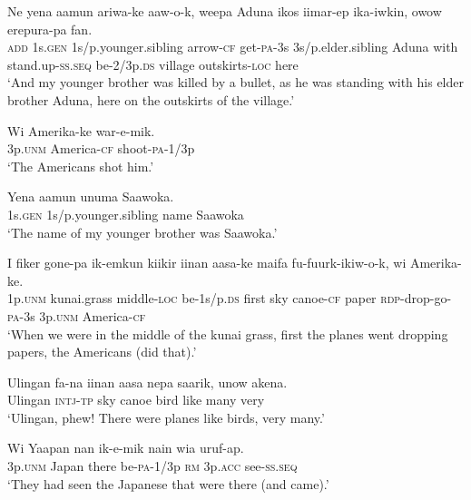 \ea\label{ex:a:x71}
\gll  Ne  yena  aamun  ariwa-ke  aaw-o-k, weepa  Aduna  ikos  iimar-ep  ika-iwkin,  owow  erepura-pa  fan. \\
\textsc{add}  1s.\textsc{gen}  1s/p.younger.sibling  arrow-\textsc{cf}  get-\textsc{pa}-3s 3s/p.elder.sibling  Aduna  with  stand.up-\textsc{ss.seq}  be-2/3p.\textsc{ds} village  outskirts-\textsc{loc}  here \\
\glt ‘And my younger brother was killed by a bullet, as he was standing with his elder brother Aduna, here on the outskirts of the village.’ \\
\z


\ea\label{ex:a:x72}
\gll  Wi  Amerika-ke  war-e-mik. \\
3p.\textsc{unm}  America-\textsc{cf}  shoot-\textsc{pa}-1/3p \\
\glt ‘The Americans shot him.’ \\
\z


\ea\label{ex:a:x73}
\gll  Yena  aamun  unuma  Saawoka. \\
1s.\textsc{gen}  1s/p.younger.sibling  name  Saawoka \\
\glt ‘The name of my younger brother was Saawoka.’ \\
\z


\ea\label{ex:a:x74}
\gll  I  fiker  gone-pa  ik-emkun  kiikir  iinan  aasa-ke maifa  fu-fuurk-ikiw-o-k,  wi  Amerika-ke. \\
1p.\textsc{unm}  kunai.grass  middle-\textsc{loc}  be-1s/p.\textsc{ds}  first  sky  canoe-\textsc{cf} paper  \textsc{rdp}-drop-go-\textsc{pa}-3s  3p.\textsc{unm}  America-\textsc{cf} \\
\glt ‘When we were in the middle of the kunai grass, first the planes went dropping papers, the Americans (did that).’ \\
\z


\ea\label{ex:a:x75}
\gll  Ulingan  fa-na  iinan  aasa  nepa  saarik,  unow  akena. \\
Ulingan  \textsc{intj}-\textsc{tp}  sky  canoe  bird  like  many  very \\
\glt ‘Ulingan, phew! There were planes like birds, very many.’ \\
\z


\ea\label{ex:a:x76}
\gll  Wi  Yaapan  nan  ik-e-mik  nain  wia  uruf-ap. \\
3p.\textsc{unm}  Japan  there  be-\textsc{pa}-1/3p  \textsc{rm}  3p.\textsc{acc}  see-\textsc{ss.seq} \\
\glt ‘They had seen the Japanese that were there (and came).’ \\
\z


